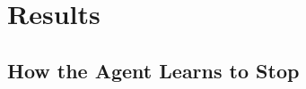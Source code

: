 \documentclass[runningheads]{llncs}
\begin{document}
\section{Results}
\label{sec:results}

\subsection{How the Agent Learns to Stop}


\end{document}
